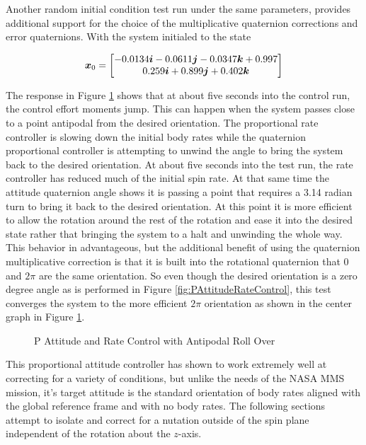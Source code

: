 Another random initial condition test run under the same parameters, provides additional support for the choice of the multiplicative quaternion corrections and error quaternions.  With the system initialed to the state

\begin{equation}
  \boldsymbol{x}_0 = \begin{bmatrix} -0.0134 \boldsymbol{i} -0.0611 \boldsymbol{j} -0.0347 \boldsymbol{k} +0.997 \\ 0.259 \boldsymbol{i} +0.899 \boldsymbol{j} +0.402 \boldsymbol{k} \end{bmatrix}
\end{equation}

The response in Figure \ref{fig:PAttitudeRateControlWithAntipodalRollOver} shows that at about five seconds into the control run, the control effort moments jump.  This can happen when the system passes close to a point antipodal from the desired orientation.  The proportional rate controller is slowing down the initial body rates while the quaternion proportional controller is attempting to unwind the angle to bring the system back to the desired orientation.  At about five seconds into the test run, the rate controller has reduced much of the initial spin rate.  At that same time the attitude quaternion angle shows it is passing a point that requires a 3.14 radian turn to bring it back to the desired orientation.  At this point it is more efficient to allow the rotation around the rest of the rotation and ease it into the desired state rather that bringing the system to a halt and unwinding the whole way.  This behavior in advantageous, but the additional benefit of using the quaternion multiplicative correction is that it is built into the rotational quaternion that 0 and $2\pi$ are the same orientation.  So even though the desired orientation is a zero degree angle as is performed in Figure \ref{fig:PAttitudeRateControl}, this test converges the system to the more efficient $2\pi$ orientation as shown in the center graph in Figure \ref{fig:PAttitudeRateControlWithAntipodalRollOver}.

\begin{figure}[H]
  \centerline{}
  \caption{P Attitude and Rate Control with Antipodal Roll Over}
  \label{fig:PAttitudeRateControlWithAntipodalRollOver}
\end{figure}

This proportional attitude controller has shown to work extremely well at correcting for a variety of conditions, but unlike the needs of the NASA MMS mission, it's target attitude is the standard orientation of body rates aligned with the global reference frame and with no body rates.  The following sections attempt to isolate and correct for a nutation outside of the spin plane independent of the rotation about the $z$-axis.



